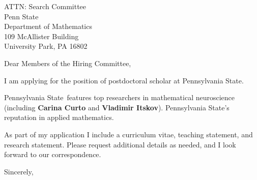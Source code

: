 \documentclass[11pt,a4paper]{letter}
\begin{document}

\def\School{Pennsylvania State}

\begin{letter}
{ATTN: Search Committee\\
Penn State\\
Department of Mathematics\\
109 McAllister Building\\
University Park, PA 16802
}


\opening{Dear Members of the Hiring Committee,}

I am applying for the position of postdoctoral scholar at \School. 



\School~features top researchers in mathematical neuroscience (including \textbf{Carina Curto} and \textbf{Vladimir Itskov}). \School's reputation in applied mathematics.



As part of my application I include a curriculum vitae, teaching statement, and research statement. Please request additional details as needed, and I look forward to our correspondence.

\closing{Sincerely,}
\end{letter}
\end{document}
